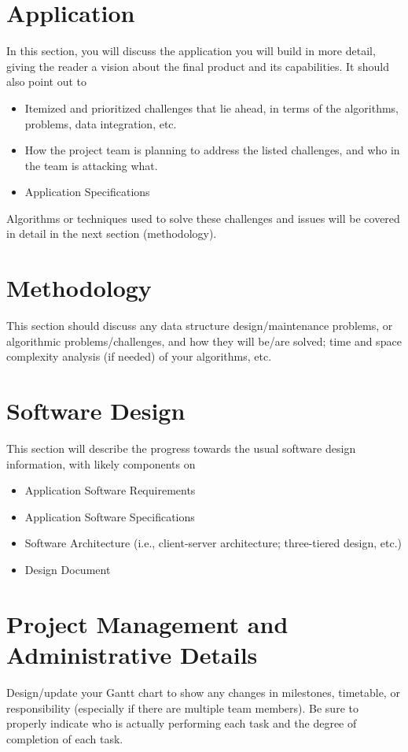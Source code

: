 \documentclass[letterpaper,12pt]{article}
\begin{document}
\section{Application}
In this section, you will discuss the application you will build in more detail,
giving the reader a vision about the final product and its capabilities. It
should also point out to
\begin{itemize}
  \item Itemized and prioritized challenges that lie ahead, in terms of the
  algorithms, problems, data integration, etc.
  \item How the project team is planning to address the listed challenges, and
  who in the team is attacking what.
  \item Application Specifications 
\end{itemize}
Algorithms or techniques used to solve these challenges and issues will be
covered in detail in the next section (methodology).
\newpage



\section{Methodology}
This section should discuss any data structure design/maintenance problems, or algorithmic 
problems/challenges, and how they will be/are solved; time and space complexity analysis (if 
needed) of your algorithms, etc. 
\newpage



\section{Software Design}
This section will describe the progress towards the usual software design information, with likely 
components on 
\begin{itemize}
  \item Application Software Requirements
  \item Application Software Specifications
  \item Software Architecture (i.e., client-server architecture; three-tiered
  design, etc.)
  \item Design Document
\end{itemize}
\newpage



\section{Project Management and Administrative Details}
Design/update your Gantt chart to show any changes in milestones, timetable, or
responsibility (especially if there are multiple team members). Be sure to
properly indicate who is actually performing each task and the degree of
completion of each task.
\end{document}

